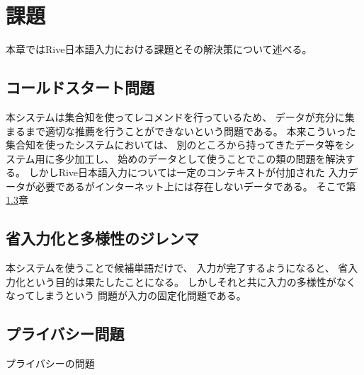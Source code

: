 \chapter{課題}
\label{chap:discussion}
本章ではRive日本語入力における課題とその解決策について述べる。

\newpage
\section{コールドスタート問題}
本システムは集合知を使ってレコメンドを行っているため、
データが充分に集まるまで適切な推薦を行うことができないという問題である。
本来こういった集合知を使ったシステムにおいては、
別のところから持ってきたデータ等をシステム用に多少加工し、
始めのデータとして使うことでこの類の問題を解決する。
しかしRive日本語入力については一定のコンテキストが付加された
入力データが必要であるがインターネット上には存在しないデータである。
そこで第\ref{}章

\section{省入力化と多様性のジレンマ}
本システムを使うことで候補単語だけで、
入力が完了するようになると、
省入力化という目的は果たしたことになる。
しかしそれと共に入力の多様性がなくなってしまうという
問題が入力の固定化問題である。

\section{プライバシー問題}
プライバシーの問題

